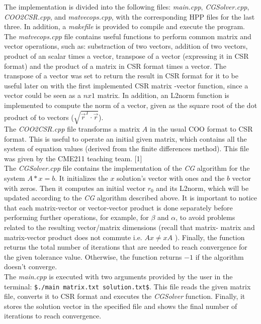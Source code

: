 \documentclass[a4paper]{article}
\begin{document}
\noindent
The implementation is divided into the following files: \textit{main.cpp}, \textit{CGSolver.cpp}, \textit{COO2CSR.cpp}, and \textit{matvecops.cpp}, with the corresponding HPP files for the last three. In addition, a \textit{makefile} is provided to compile and execute the program.\\

The \textit{matvecops.cpp} file contains useful functions to perform common matrix and vector operations, such as: substraction of two vectors, addition of two vectors, product of an scalar times a vector, transpose of a vector (expressing it in CSR format) and the product of a matrix in CSR format times a vector. The transpose of a vector was set to return the result in CSR format for it to be useful later on with the first implemented CSR matrix -vector function, since a vector could be seen as a $n x 1 $ matrix. In addition, an L2norm function is implemented to compute the norm of a vector, given as the square root of the dot product of to vectors ($\sqrt{\vec{r}^{T}\cdot\vec{r}}$).\\

The \textit{COO2CSR.cpp} file transforms a matrix $A$ in the usual COO format to CSR format. This is useful to operate an initial given matrix, which contains all the system of equation values (derived from the finite differences method). This file was given by the CME211 teaching team. [1] \\

The \textit{CGSolver.cpp} file contains the implementation of the \textit{CG} algorithm for the system $A*x = b$. It initializes the $x$ solution's vector with ones and the $b$ vector with zeros. Then it computes an initial vector $r_{0}$ and its L2norm, which will be updated according to the \textit{CG} algorithm described above. It is important to notice that each matrix-vector or vector-vector product is done separately before performing further operations, for example, for $\beta$ and $\alpha$, to avoid problems related to the resulting vector/matrix dimensions (recall that matrix- matrix and matrix-vector product does not commute i.e. $Ax \neq xA$ ). Finally, the function returns the total number of iterations that are needed to reach convergence for the given tolerance value. Otherwise, the function returns $-1$ if the algorithm doesn't converge. \\

The \textit{main.cpp} is executed with two arguments provided by the user in the terminal: \texttt{\$./main matrix.txt solution.txt\$}. This file reads the given matrix file, converts it to CSR format and executes the \textit{CGSolver} function. Finally, it stores the solution vector in the specified file and shows the final number of iterations to reach convergence. 
\end{document}
